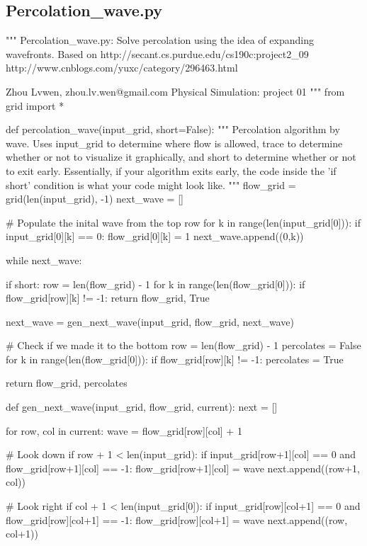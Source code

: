\documentclass[11pt,a4paper,boxed]{caspset}
\begin{document}
\begin{subappendices}
\section{Percolation\_wave.py}
\begin{python}
"""
Percolation_wave.py: Solve percolation using the idea of expanding
                     wavefronts.
Based on http://secant.cs.purdue.edu/cs190c:project2\_09
         http://www.cnblogs.com/yuxc/category/296463.html

Zhou Lvwen, zhou.lv.wen@gmail.com
Physical Simulation: project 01
"""
from grid import *

def percolation_wave(input_grid, short=False):
    """
    Percolation algorithm by wave. Uses input_grid to determine where
    flow is allowed, trace to determine whether or not to visualize it
    graphically, and short to determine whether or not to exit early.
    Essentially, if your algorithm exits early, the code inside the
    'if short' condition is what your code might look like.
    """
    flow_grid = grid(len(input_grid), -1)
    next_wave = []

    # Populate the inital wave from the top row
    for k in range(len(input_grid[0])):
        if input_grid[0][k] == 0:
            flow_grid[0][k] = 1
            next_wave.append((0,k))

    while next_wave:

        if short:
            row = len(flow_grid) - 1
            for k in range(len(flow_grid[0])):
                if flow_grid[row][k] != -1:
                    return flow_grid, True

        next_wave = gen_next_wave(input_grid, flow_grid, next_wave)

    # Check if we made it to the bottom
    row = len(flow_grid) - 1
    percolates = False
    for k in range(len(flow_grid[0])):
        if flow_grid[row][k] != -1:
            percolates = True

    return flow_grid, percolates

def gen_next_wave(input_grid, flow_grid, current):
    next = []

    for row, col in current:
        wave = flow_grid[row][col] + 1

        # Look down
        if row + 1 < len(input_grid):
            if input_grid[row+1][col] == 0 and flow_grid[row+1][col] == -1:
                flow_grid[row+1][col] = wave
                next.append((row+1, col))

        # Look right
        if col + 1 < len(input_grid[0]):
            if input_grid[row][col+1] == 0 and flow_grid[row][col+1] == -1:
                flow_grid[row][col+1] = wave
                next.append((row, col+1))


\end{python}
\end{subappendices}
\end{document}
